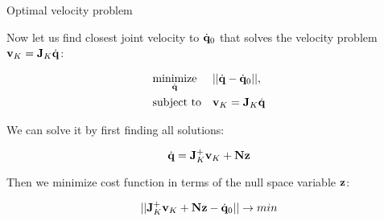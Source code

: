 \documentclass{beamer}
\begin{document}
\begin{frame}{Optimal velocity problem}
	\begin{flushleft}
		
		Now let us find closest joint velocity to $\dot{\mathbf{q}}_0$ that solves the velocity problem $\mathbf{v}_K = \mathbf{J}_K \dot{\mathbf{q}}$:
		
\begin{equation}
	\begin{aligned}
		& \underset{\dot{\mathbf{q}}}{\text{minimize}}
		& & || \dot{\mathbf{q}} - \dot{\mathbf{q}}_0 ||, \\
		& \text{subject to}
		& & \mathbf{v}_K = \mathbf{J}_K \dot{\mathbf{q}}
	\end{aligned}
\end{equation}
		
		We can solve it by first finding all solutions:
		
		\begin{equation}
			\dot{\mathbf{q}} = \mathbf{J}_K^+ \mathbf{v}_K + \mathbf{N} \mathbf{z}
		\end{equation}			
	
	Then we minimize cost function in terms of the null space variable $\mathbf{z}$:
	
		\begin{equation}
			|| \mathbf{J}_K^+ \mathbf{v}_K + \mathbf{N} \mathbf{z} - \dot{\mathbf{q}}_0 || \rightarrow min
		\end{equation}	
		
	\end{flushleft}
\end{frame}
\end{document}
